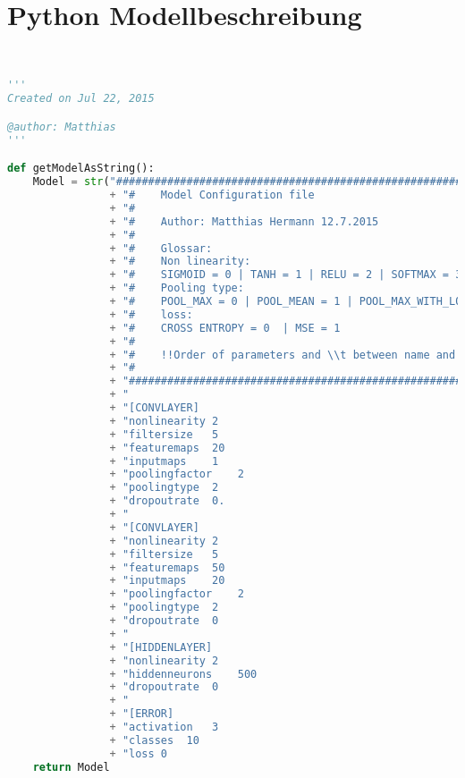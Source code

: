 \section{Python Modellbeschreibung}


\begin{lstlisting}[language=Python,label=ls:struct,caption=Definitionen der Structs für die Kommunikation zwischen den einzelnen Schichten des CNN,captionpos=b]


'''
Created on Jul 22, 2015

@author: Matthias
'''

def getModelAsString():
	Model = str("########################################################################################### 		\n" 
				+ "#	Model Configuration file 																	\n"
				+ "#	 																							\n"
				+ "#	Author: Matthias Hermann 12.7.2015 															\n"
				+ "# 																								\n"
				+ "#	Glossar: 																					\n"
				+ "#	Non linearity: 																				\n"
				+ "# 	SIGMOID = 0 | TANH = 1 | RELU = 2 | SOFTMAX = 3 | SOFTPLUS = 4 	| LINEAR = 5				\n"
				+ "#	Pooling type: 																				\n"
				+ "#	POOL_MAX = 0 | POOL_MEAN = 1 | POOL_MAX_WITH_LOCATION = 2 | POOL_STOCHASTIC = 3 			\n"
				+ "#	loss: 																						\n"
				+ "#	CROSS ENTROPY = 0  | MSE = 1 																\n"
				+ "# 																								\n"
				+ "#	!!Order of parameters and \\t between name and value matters!!! 								\n"
				+ "# 																								\n"
				+ "########################################################################################### 		\n"
				+ "																									\n"
				+ "[CONVLAYER]																						\n"
				+ "nonlinearity	2																					\n"
				+ "filtersize	5																					\n"
				+ "featuremaps	20																					\n"
				+ "inputmaps	1																					\n"
				+ "poolingfactor	2																				\n"
				+ "poolingtype	2																					\n"
				+ "dropoutrate	0.																					\n"
				+ "																									\n"
				+ "[CONVLAYER]                                                                                      \n"   
				+ "nonlinearity	2																					\n"
				+ "filtersize	5																					\n"
				+ "featuremaps	50																					\n"
				+ "inputmaps	20																					\n"
				+ "poolingfactor	2																				\n"
				+ "poolingtype	2																					\n"
				+ "dropoutrate	0																					\n"
				+ "																									\n"
				+ "[HIDDENLAYER]																					\n"
				+ "nonlinearity	2																					\n"
				+ "hiddenneurons	500																				\n"
				+ "dropoutrate	0 																					\n"
				+ "																									\n"
				+ "[ERROR]																							\n"
				+ "activation	3																					\n"
				+ "classes	10																						\n"
				+ "loss	0																							\n")
	return Model	
	
	
\end{lstlisting}